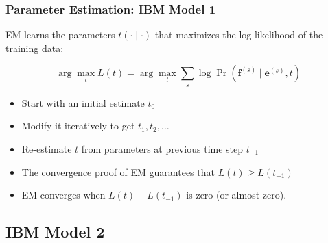 \begin{frame}
\frametitle{Parameter Estimation: IBM Model 1}
\begin{block}{}
EM learns the parameters $t(\cdot \mid \cdot)$ that maximizes
the log-likelihood of the training data:

\[ \arg\max_{t} L(t) = \arg\max_{t} \sum_s \log \Pr(\mathbf{f}^{(s)} \mid
\mathbf{e}^{(s)}, t) \]
\end{block}\pause

\begin{block}{}
\begin{itemize}[<+->]
\item Start with an initial estimate $t_0$
\item Modify it iteratively to get $t_1, t_2, \ldots$
\item Re-estimate $t$ from parameters at previous time step $t_{-1}$
\item The convergence proof of EM guarantees that $L(t) \geq L(t_{-1})$
\item EM converges when $L(t) - L(t_{-1})$ is zero (or almost zero).
\end{itemize}

\end{block}
\end{frame}

\subsection{IBM Model 2}
\frame{\tableofcontents[currentsection]}

